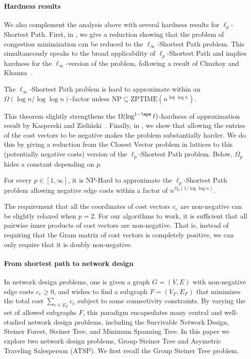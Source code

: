 \documentclass[11pt,a4paper]{article}
\begin{document}
\paragraph{Hardness results} We also complement the analysis above with several hardness results for $\ell_p$-Shortest Path. First, in , we give a reduction showing that the problem of congestion minimization can be reduced to the $\ell_\infty$-Shortest Path problem. This simultaneously speaks to the broad applicability of $\ell_p$-Shortest Path and implies hardness for the $\ell_\infty$-version of the problem, following a result of Chuzhoy and Khanna~\cite{chuzhoy2006hardness}. 
\begin{theorem}\label{thm:intro-hardness-from-congestion-minimization}
    The $\ell_\infty$-Shortest Path problem is hard to approximate within an $\Omega(\log n/\log\log n)$-factor unless $\mathrm{NP} \subseteq \mathrm{ZPTIME}(n^{\log \log n})$.
\end{theorem}
This theorem slightly strengthens the $\Omega(\log^{1-\eps} \ell)$-hardness of approximation result by
 Kasperski and Zieli\'nski~\cite{kasperski2009approximability}.
%
Finally, in , we show that allowing the entries of the cost vectors to be negative makes the problem substantially harder. We do this by giving a reduction from the Closest Vector problem in lattices to this (potentially negative costs) version of the $\ell_p$-Shortest Path problem.
Below, \(\Omega_p\) hides a constant depending on \(p\).
\begin{theorem}\label{thm:intro-hardness-from-CVP}
     For every $p \in [1,\infty]$, it is \(\mathrm{NP}\)-Hard to approximate the $\ell_p$-Shortest Path problem allowing negative edge costs within a factor of $n^{\Omega_p(1 / \log \log n)}$.
\end{theorem}
\begin{remark}
The requirement that all the coordinates of cost vectors $c_e$ are non-negative can be slightly relaxed when $p=2$. For our algorithms to work, it is sufficient that all pairwise inner products of cost vectors are non-negative. That is, instead of requiring that the Gram matrix of cost vectors is completely positive, we can only require that it is doubly non-negative. 
\end{remark}

\paragraph{From shortest path to network design} In network design problems, one is
given a graph \(G = (V, E)\) with non-negative edge costs \(c_e \geq 0\), and wishes to find a subgraph \(F =(V_F, E_F)\) that minimizes the total cost \(\sum_{e \in E_F} c_e \) subject to some connectivity constraints.
By varying the set of allowed subgraphs \(F\), this paradigm encapsulates many central and well-studied network design problems, including the Survivable Network Design, Steiner Forest, Steiner Tree, and Minimum Spanning Tree.
%
In this paper we explore two network design problems, Group Steiner Tree and Asymetric Traveling Salesperson (ATSP). We first recall the Group Steiner Tree problem.
\end{document}
